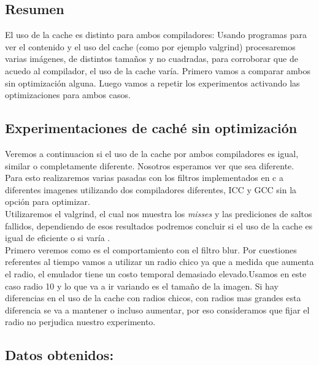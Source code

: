 \subsection{Resumen}

El uso de la cache es distinto para ambos compiladores: Usando programas para ver el contenido y el uso del cache (como por ejemplo valgrind) procesaremos varias imágenes, de distintos tamaños y no cuadradas, para corroborar que de acuedo al compilador, el uso de la cache varía. Primero vamos a comparar ambos sin optimización alguna. Luego vamos a repetir los experimentos activando las optimizaciones para ambos casos. \\


\subsection{Experimentaciones de caché sin optimización}

Veremos a continuacion si el uso de la cache por ambos compiladores es igual, similar o completamente diferente. Nosotros esperamos ver que sea diferente. Para esto realizaremos varias pasadas con los filtros implementados en c a diferentes imagenes utilizando dos compiladores diferentes, ICC y GCC sin la opción para optimizar. \\

Utilizaremos el valgrind, el cual nos muestra los \textit{misses} y las prediciones de saltos fallidos, dependiendo de esos resultados podremos concluir si el uso de la cache es igual de eficiente o si varía .\\

Primero veremos como es el comportamiento con el filtro blur. Por cuestiones referentes al tiempo vamos a utilizar un radio chico ya que a medida que aumenta el radio, el emulador tiene un costo temporal demasiado elevado.Usamos en este caso radio 10 y lo que va a ir variando es el tamaño de la imagen. Si hay diferencias en el uso de la cache con radios chicos, con radios mas grandes esta diferencia se va a mantener o incluso aumentar, por eso consideramos que fijar el radio no perjudica nuestro experimento. \\

\subsection{Datos obtenidos:}

